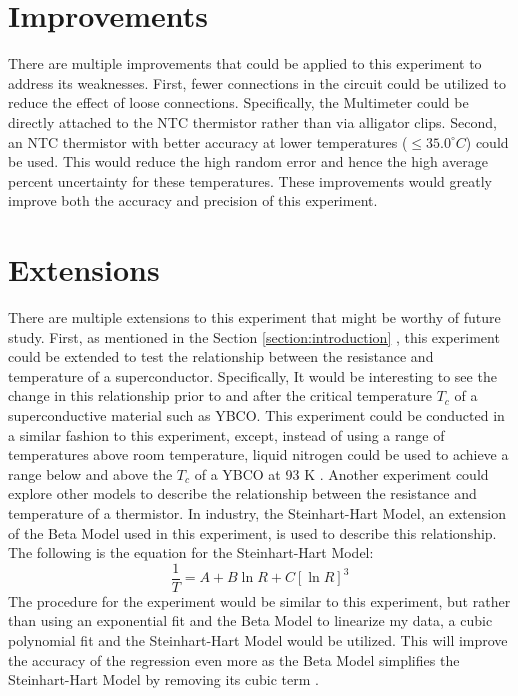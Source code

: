 \section{Improvements}
There are multiple improvements that could be applied to this experiment to address its weaknesses. First, fewer connections in the circuit could be utilized to reduce the effect of loose connections. Specifically, the Multimeter could be directly attached to the NTC thermistor rather than via alligator clips. Second, an NTC thermistor with better accuracy at lower temperatures ($\le 35.0^\circ C$) could be used. This would reduce the high random error and hence the high average percent uncertainty for these temperatures. These improvements would greatly improve both the accuracy and precision of this experiment.

\section{Extensions}
There are multiple extensions to this experiment that might be worthy of future study. First, as mentioned in the Section \ref{section:introduction} , this experiment could be extended to test the relationship between the resistance and temperature of a superconductor. Specifically, It would be interesting to see the change in this relationship prior to and after the critical temperature $T_c$ of a superconductive material such as YBCO. This experiment could be conducted in a similar fashion to this experiment, except, instead of using a range of temperatures above room temperature, liquid nitrogen could be used to achieve a range below and above the $T_c$ of a YBCO at 93 K \citep{butera1997dependence}.
Another experiment could explore other models to describe the relationship between the resistance and temperature of a thermistor. In industry, the Steinhart-Hart Model, an extension of the Beta Model used in this experiment, is used to describe this relationship. The following  is the equation for the Steinhart-Hart Model:
\[\frac{1}{T}=A+B\ln{R}+C[\ln{R}]^3\]
The procedure for the experiment would be similar to this experiment, but rather than using an exponential fit and the Beta Model to linearize my data, a cubic polynomial fit and the Steinhart-Hart Model would be utilized. This will improve the accuracy of the regression even more as the Beta Model simplifies the Steinhart-Hart Model by removing its cubic term \citep{rana2018fpga}.
